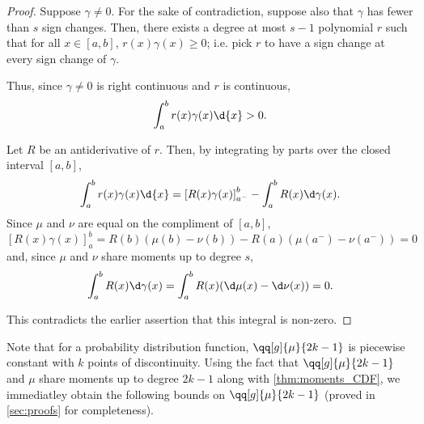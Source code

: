 \begin{proof}
Suppose \( \gamma \neq 0 \).
For the sake of contradiction, suppose also that \( \gamma \) has fewer than \( s \) sign changes.
Then, there exists a degree at most \( s-1 \) polynomial \( r \) such that for all \( x \in [a,b] \), \( r(x) \gamma(x) \geq 0 \); i.e. pick \( r \) to have a sign change at every sign change of \( \gamma \).

Thus, since \( \gamma \neq 0 \) is right continuous and \( r \) is continuous, 
\begin{equation*}
    \int_{a}^{b} r(x) \gamma(x) \d{x} > 0.
\end{equation*}

Let \( R \) be an antiderivative of \( r \).
Then, by integrating by parts over the closed interval \( [a,b] \),
\begin{equation*}
    \int_{a}^{b} r(x) \gamma(x) \d{x} 
    = \left[ R(x) \gamma(x) \right]_{a^-}^b - \int_{a}^{b} R(x) \d\gamma(x).
\end{equation*}
Since \( \mu \) and \( \nu \) are equal on the compliment of \( [a,b] \),
\begin{equation*}
    \left[ R(x) \gamma(x) \right]_a^b 
    = R(b) ( \mu(b) - \nu(b)) - R(a) (\mu(a^-) - \nu(a^-))
    = 0
\end{equation*}
and, since \( \mu \) and \( \nu \) share moments up to degree \( s \),
\begin{equation*}
    \int_{a}^{b} R(x) \d\gamma(x)
    = \int_{a}^{b} R(x) (\d\mu(x) - \d\nu(x))
    =0 .
\end{equation*}

This contradicts the earlier assertion that this integral is non-zero.%
\end{proof}

Note that for a probability distribution function, \( \qq[g]{\mu}{2k-1} \) is piecewise constant with \( k \) points of discontinuity.
Using the fact that \( \qq[g]{\mu}{2k-1} \) and \( \mu \) share moments up to degree \( 2k-1 \) along with \cref{thm:moments_CDF}, we immediatley obtain the following bounds on \( \qq[g]{\mu}{2k-1} \) (proved in \cref{sec:proofs} for completeness).


